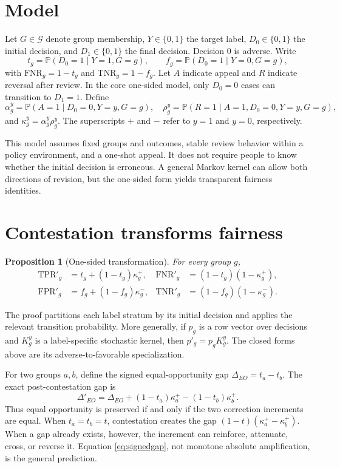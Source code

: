 \documentclass[manuscript,screen,review]{jair}
\newtheorem{proposition}[theorem]{Proposition}
\newcommand{\Prb}{\mathbb{P}}
\begin{document}
\section{Model}

Let $G\in\mathcal G$ denote group membership, $Y\in\{0,1\}$ the target label,
$D_0\in\{0,1\}$ the initial decision, and $D_1\in\{0,1\}$ the final decision.
Decision 0 is adverse.  Write
\[
 t_g=\Prb(D_0=1\mid Y=1,G=g),\qquad
 f_g=\Prb(D_0=1\mid Y=0,G=g),
\]
with $\mathrm{FNR}_g=1-t_g$ and $\mathrm{TNR}_g=1-f_g$.
Let $A$ indicate appeal and $R$ indicate reversal after review.  In the core
one-sided model, only $D_0=0$ cases can transition to $D_1=1$.  Define
\[
 \alpha_g^y=\Prb(A=1\mid D_0=0,Y=y,G=g),\quad
 \rho_g^y=\Prb(R=1\mid A=1,D_0=0,Y=y,G=g),
\]
and $\kappa_g^y=\alpha_g^y\rho_g^y$.  The superscripts $+$ and $-$ refer to
$y=1$ and $y=0$, respectively.

This model assumes fixed groups and outcomes, stable review behavior within a
policy environment, and a one-shot appeal.  It does not require people to know
whether the initial decision is erroneous.  A general Markov kernel can allow
both directions of revision, but the one-sided form yields transparent
fairness identities.

\section{Contestation transforms fairness}

\begin{proposition}[One-sided transformation]
For every group $g$,
\begin{align}
 \mathrm{TPR}'_g &= t_g+(1-t_g)\kappa_g^+, &
 \mathrm{FNR}'_g &= (1-t_g)(1-\kappa_g^+),\\
 \mathrm{FPR}'_g &= f_g+(1-f_g)\kappa_g^-, &
 \mathrm{TNR}'_g &= (1-f_g)(1-\kappa_g^-).
\end{align}
\end{proposition}

The proof partitions each label stratum by its initial decision and applies
the relevant transition probability.  More generally, if $p_g$ is a row
vector over decisions and $K_g^y$ is a label-specific stochastic kernel, then
$p'_g=p_gK_g^y$.  The closed forms above are its adverse-to-favorable
specialization.

For two groups $a,b$, define the signed equal-opportunity gap
$\Delta_{EO}=t_a-t_b$.  The exact post-contestation gap is
\begin{equation}
 \Delta'_{EO}=\Delta_{EO}+(1-t_a)\kappa_a^+-(1-t_b)\kappa_b^+.
 \label{eq:signedgap}
\end{equation}
Thus equal opportunity is preserved if and only if the two correction
increments are equal.  When $t_a=t_b=t$, contestation creates the gap
$(1-t)(\kappa_a^+-\kappa_b^+)$.  When a gap already exists, however, the
increment can reinforce, attenuate, cross, or reverse it.  Equation
\eqref{eq:signedgap}, not monotone absolute amplification, is the general
prediction.
\end{document}
